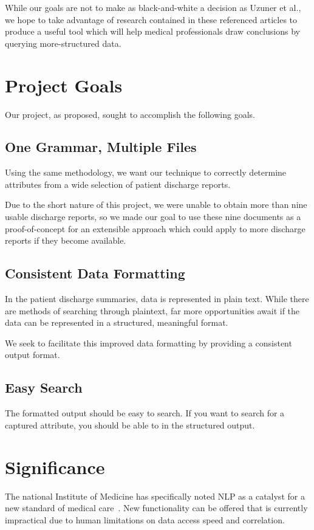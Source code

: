 \documentclass{acm_proc_article-sp}
\begin{document}
While our goals are not to make as black-and-white a decision as Uzuner et al., we hope to take 
advantage of research contained in these referenced articles to produce a useful tool which will
help medical professionals draw conclusions by querying more-structured data.

\section{Project Goals}
Our project, as proposed, sought to accomplish the following goals.
\subsection{One Grammar, Multiple Files}
Using the same methodology, we want our technique to correctly determine attributes from a wide selection
of patient discharge reports.

Due to the short nature of this project, we were unable to obtain more than nine usable discharge reports,
so we made our goal to use these nine documents as a proof-of-concept for an extensible approach which
could apply to more discharge reports if they become available.

\subsection{Consistent Data Formatting}
In the patient discharge summaries, data is represented in plain text. While there are methods of
searching through plaintext, far more opportunities await if the data can be represented in a 
structured, meaningful format.

We seek to facilitate this improved data formatting by providing a consistent output format.
\subsection{Easy Search}
The formatted output should be easy to search. If you want to search for a captured attribute,
you should be able to in the structured output.

\section{Significance}
The national Institute of Medicine has specifically noted NLP as a catalyst for a new
standard of medical care~\cite{friedman}. New functionality can be offered that is currently
impractical due to human limitations on data access speed and correlation.
\end{document}

